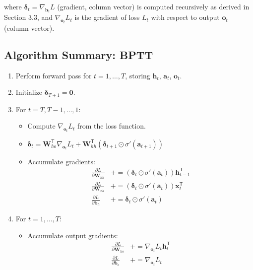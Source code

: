 \begin{notechapter}
where $\bm{\delta}_t = \nabla_{\mathbf{h}_t} L$ (gradient, column vector) is
computed recursively as derived in Section 3.3, and $\nabla_{\mathbf{o}_t} L_t$
is the gradient of loss $L_t$ with respect to output $\mathbf{o}_t$ (column
vector).

\subsection{Algorithm Summary: BPTT}
\begin{enumerate}
    \item Perform forward pass for $t=1,\dots,T$, storing $\mathbf{h}_t$, $\mathbf{a}_t$, $\mathbf{o}_t$.
    \item Initialize $\bm{\delta}_{T+1} = \mathbf{0}$.
    \item For $t = T, T-1, \dots, 1$:
    \begin{itemize}
        \item Compute $\nabla_{\mathbf{o}_t} L_t$ from the loss function.
        \item $\bm{\delta}_t = \mathbf{W}_{ho}^\mathsf{T} \nabla_{\mathbf{o}_t} L_t + \mathbf{W}_{hh}^\mathsf{T} \left( \bm{\delta}_{t+1} \odot \sigma'(\mathbf{a}_{t+1}) \right)$
        \item Accumulate gradients:
        \begin{align*}
            \frac{\partial L}{\partial \mathbf{W}_{hh}} &+= \left( \bm{\delta}_t \odot \sigma'(\mathbf{a}_t) \right) \mathbf{h}_{t-1}^\mathsf{T} \\
            \frac{\partial L}{\partial \mathbf{W}_{xh}} &+= \left( \bm{\delta}_t \odot \sigma'(\mathbf{a}_t) \right) \mathbf{x}_t^\mathsf{T} \\
\frac{\partial L}{\partial \mathbf{b}_h} &+= \bm{\delta}_t \odot
\sigma'(\mathbf{a}_t)
        \end{align*}
    \end{itemize}
    \item For $t = 1,\dots,T$:
    \begin{itemize}
        \item Accumulate output gradients:
        \begin{align*}
            \frac{\partial L}{\partial \mathbf{W}_{ho}} &+= \nabla_{\mathbf{o}_t} L_t \mathbf{h}_t^\mathsf{T} \\
\frac{\partial L}{\partial \mathbf{b}_o} &+= \nabla_{\mathbf{o}_t} L_t
        \end{align*}
    \end{itemize}
\end{enumerate}


\end{notechapter}
